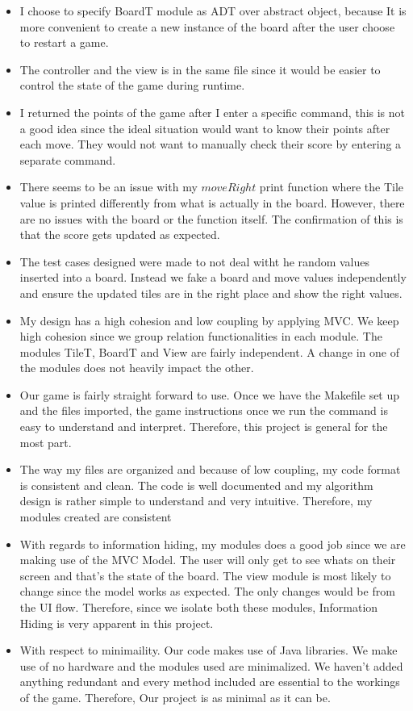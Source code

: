 \documentclass[12pt]{article}
\begin{document}
\begin{itemize}
  \item I choose to specify BoardT module as ADT over abstract object, because It is more convenient to create a new instance of the board after the
        user choose to restart a game.
  \item The controller and the view is in the same file since it would be easier to control
  the state of the game during runtime.
  \item I returned the points of the game after I enter a specific command, this is not a good idea since the ideal situation would want to know their points after each move. They would not want to manually check their score by entering a separate command.
  \item There seems to be an issue with my $moveRight$ print function where the Tile value
  is printed differently from what is actually in the board. However, there are no issues with the board or the function itself. The confirmation of this is that the score gets updated as expected.
  \item The test cases designed were made to not deal witht he random values inserted into a board. Instead we fake a board and move values independently and ensure the updated tiles
  are in the right place and show the right values.
  \item My design has a high cohesion and low coupling by applying MVC. We keep high cohesion since we group relation functionalities in each module. The modules TileT, BoardT and View are fairly independent. A change in one of the modules does not heavily impact the other.
  \item Our game is fairly straight forward to use. Once we have the Makefile set up and the files imported, the game instructions once we run the command is easy to understand and interpret. Therefore, this project is general for the most part.
  \item The way my files are organized and because of low coupling, my code format is consistent and clean. The code is well documented and my algorithm design is rather simple to understand and very intuitive. Therefore, my modules created are consistent
  \item With regards to information hiding, my modules does a good job since we are making use of the MVC Model. The user will only get to see whats on their screen and that's the state of the board. The view module is most likely to change since the model works as expected. The only changes would be from the UI flow. Therefore, since we isolate both these modules, Information Hiding is very apparent in this project.
  \item With respect to minimaility. Our code makes use of Java libraries. We make use of no hardware and the modules used are minimalized. We haven't added anything redundant and every method included are essential to the workings of the game. Therefore, Our project is as minimal as it can be.
\end{itemize}
\end{document}
